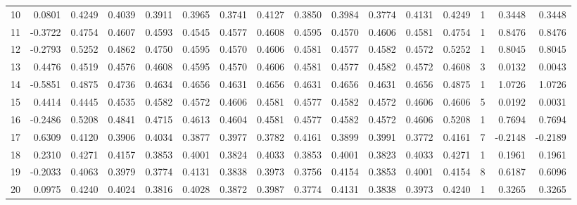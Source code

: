\begin{tabular}{lrrrrrrrrrrrrrrr}
10  &      0.0801 &  0.4249 &  0.4039 &  0.3911 &  0.3965 &  0.3741 &  0.4127 &  0.3850 &  0.3984 &  0.3774 &   0.4131 &     0.4249 &      1 &                    0.3448 &                     0.3448 \\
11  &     -0.3722 &  0.4754 &  0.4607 &  0.4593 &  0.4545 &  0.4577 &  0.4608 &  0.4595 &  0.4570 &  0.4606 &   0.4581 &     0.4754 &      1 &                    0.8476 &                     0.8476 \\
12  &     -0.2793 &  0.5252 &  0.4862 &  0.4750 &  0.4595 &  0.4570 &  0.4606 &  0.4581 &  0.4577 &  0.4582 &   0.4572 &     0.5252 &      1 &                    0.8045 &                     0.8045 \\
13  &      0.4476 &  0.4519 &  0.4576 &  0.4608 &  0.4595 &  0.4570 &  0.4606 &  0.4581 &  0.4577 &  0.4582 &   0.4572 &     0.4608 &      3 &                    0.0132 &                     0.0043 \\
14  &     -0.5851 &  0.4875 &  0.4736 &  0.4634 &  0.4656 &  0.4631 &  0.4656 &  0.4631 &  0.4656 &  0.4631 &   0.4656 &     0.4875 &      1 &                    1.0726 &                     1.0726 \\
15  &      0.4414 &  0.4445 &  0.4535 &  0.4582 &  0.4572 &  0.4606 &  0.4581 &  0.4577 &  0.4582 &  0.4572 &   0.4606 &     0.4606 &      5 &                    0.0192 &                     0.0031 \\
16  &     -0.2486 &  0.5208 &  0.4841 &  0.4715 &  0.4613 &  0.4604 &  0.4581 &  0.4577 &  0.4582 &  0.4572 &   0.4606 &     0.5208 &      1 &                    0.7694 &                     0.7694 \\
17  &      0.6309 &  0.4120 &  0.3906 &  0.4034 &  0.3877 &  0.3977 &  0.3782 &  0.4161 &  0.3899 &  0.3991 &   0.3772 &     0.4161 &      7 &                   -0.2148 &                    -0.2189 \\
18  &      0.2310 &  0.4271 &  0.4157 &  0.3853 &  0.4001 &  0.3824 &  0.4033 &  0.3853 &  0.4001 &  0.3823 &   0.4033 &     0.4271 &      1 &                    0.1961 &                     0.1961 \\
19  &     -0.2033 &  0.4063 &  0.3979 &  0.3774 &  0.4131 &  0.3838 &  0.3973 &  0.3756 &  0.4154 &  0.3853 &   0.4001 &     0.4154 &      8 &                    0.6187 &                     0.6096 \\
20  &      0.0975 &  0.4240 &  0.4024 &  0.3816 &  0.4028 &  0.3872 &  0.3987 &  0.3774 &  0.4131 &  0.3838 &   0.3973 &     0.4240 &      1 &                    0.3265 &                     0.3265 \\

\end{tabular}
